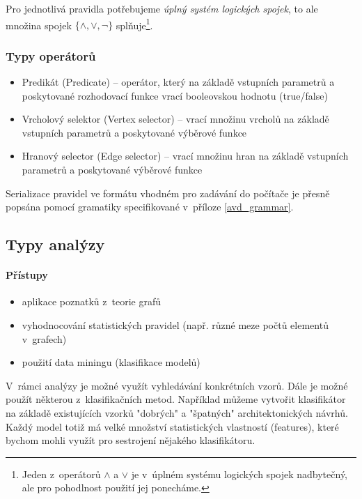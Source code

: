 Pro jednotlivá pravidla potřebujeme \emph{úplný systém logických spojek}, to ale množina spojek $\{\wedge, \vee, \neg\}$ splňuje\footnote{Jeden z~operátorů $\wedge$ a $\vee$ je v~úplném systému logických spojek nadbytečný, ale pro pohodlnost použití jej ponecháme.}.

\subsubsection{Typy operátorů}
\begin{itemize}
\item Predikát (Predicate) -- operátor, který na základě vstupních parametrů a poskytované rozhodovací funkce vrací booleovskou hodnotu (true/false)
\item Vrcholový selektor (Vertex selector) -- vrací množinu vrcholů na základě vstupních parametrů a poskytované výběrové funkce
\item Hranový selector (Edge selector) -- vrací množinu hran na základě vstupních parametrů a poskytované výběrové funkce
\end{itemize}


Serializace pravidel ve formátu vhodném pro zadávání do počítače je přesně popsána pomocí gramatiky specifikované v~příloze \ref{avd_grammar}.


\subsection{Typy analýzy}

\paragraph{Přístupy}
\begin{itemize}
\item aplikace poznatků z~teorie grafů
\item vyhodnocování statistických pravidel (např. různé meze počtů elementů v~grafech)
\item použití data miningu (klasifikace modelů)
\end{itemize}

V~rámci analýzy je možné využít vyhledávání konkrétních vzorů. Dále je možné použít některou z~klasifikačních metod. Například můžeme vytvořit klasifikátor na základě existujících vzorků "dobrých" a "špatných" architektonických návrhů. Každý model totiž má velké množství statistických vlastností (features), které bychom mohli využít pro sestrojení nějakého klasifikátoru.


